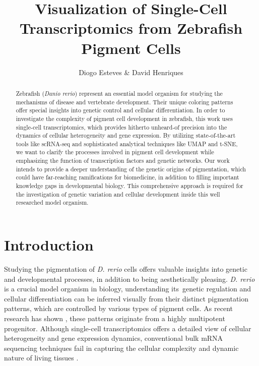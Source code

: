 \documentclass[runningheads]{llncs}
\begin{document}
\title{Visualization of Single-Cell Transcriptomics from Zebrafish Pigment Cells}

\author{Diogo Esteves \& David Henriques}


\maketitle

\begin{abstract}
Zebrafish (\textit{Danio rerio}) represent an essential model organism for studying the mechanisms of disease and vertebrate development. Their unique coloring patterns offer special insights into genetic control and cellular differentiation. In order to investigate the complexity of pigment cell development in zebrafish, this work uses single-cell transcriptomics, which provides hitherto unheard-of precision into the dynamics of cellular heterogeneity and gene expression. By utilizing state-of-the-art tools like scRNA-seq and sophisticated analytical techniques like UMAP and t-SNE, we want to clarify the processes involved in pigment cell development while emphasizing the function of transcription factors and genetic networks. Our work intends to provide a deeper understanding of the genetic origins of pigmentation, which could have far-reaching ramifications for biomedicine, in addition to filling important knowledge gaps in developmental biology. This comprehensive approach is required for the investigation of genetic variation and cellular development inside this well researched model organism.
\end{abstract}

\section{Introduction}
\lettrine[]{S}{}tudying the pigmentation of \textit{D. rerio} cells offers valuable insights into genetic and developmental processes, in addition to being aesthetically pleasing. \textit{D. rerio} is a crucial model organism in biology, understanding its genetic regulation and cellular differentiation can be inferred visually from their distinct pigmentation patterns, which are controlled by various types of pigment cells. As recent research has shown \cite{subkhankulova2023zebrafish,howard2021atlas}, these patterns originate from a highly multipotent progenitor. Although single-cell transcriptomics offers a detailed view of cellular heterogeneity and gene expression dynamics, conventional bulk mRNA sequencing techniques fail in capturing the cellular complexity and dynamic nature of living tissues \cite{nayak2021hitchhiker}.
\end{document}
